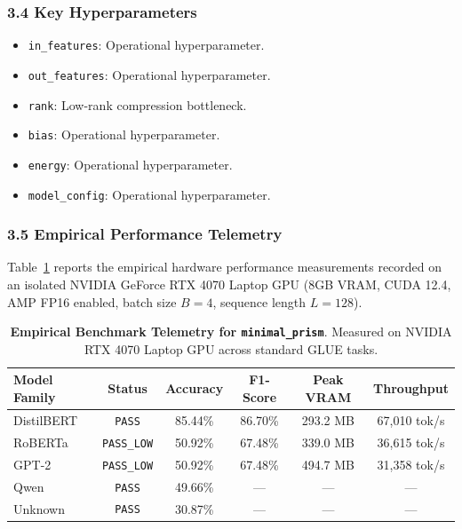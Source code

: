 \subsubsection*{3.4 Key Hyperparameters}
\begin{itemize}
    \item \texttt{in\_features}: Operational hyperparameter.
    \item \texttt{out\_features}: Operational hyperparameter.
    \item \texttt{rank}: Low-rank compression bottleneck.
    \item \texttt{bias}: Operational hyperparameter.
    \item \texttt{energy}: Operational hyperparameter.
    \item \texttt{model\_config}: Operational hyperparameter.
\end{itemize}

\subsubsection*{3.5 Empirical Performance Telemetry}
Table~\ref{tab:telemetry_minimal_prism} reports the empirical hardware performance measurements recorded on an isolated NVIDIA GeForce RTX 4070 Laptop GPU (8GB VRAM, CUDA 12.4, AMP FP16 enabled, batch size $B=4$, sequence length $L=128$).

\begin{table}[h]
\centering
\small
\caption{\textbf{Empirical Benchmark Telemetry for \texttt{minimal\_prism}}. Measured on NVIDIA RTX 4070 Laptop GPU across standard GLUE tasks.}
\label{tab:telemetry_minimal_prism}
\begin{tabular*}{\columnwidth}{@{\extracolsep{\fill}}lccccc}
\toprule
\textbf{Model Family} & \textbf{Status} & \textbf{Accuracy} & \textbf{F1-Score} & \textbf{Peak VRAM} & \textbf{Throughput} \\
\midrule
DistilBERT & \texttt{PASS} & 85.44\% & 86.70\% & 293.2 MB & 67,010 tok/s \\
RoBERTa & \texttt{PASS\_LOW} & 50.92\% & 67.48\% & 339.0 MB & 36,615 tok/s \\
GPT-2 & \texttt{PASS\_LOW} & 50.92\% & 67.48\% & 494.7 MB & 31,358 tok/s \\
Qwen & \texttt{PASS} & 49.66\% & --- & --- & --- \\
Unknown & \texttt{PASS} & 30.87\% & --- & --- & --- \\
\bottomrule
\end{tabular*}
\end{table}

